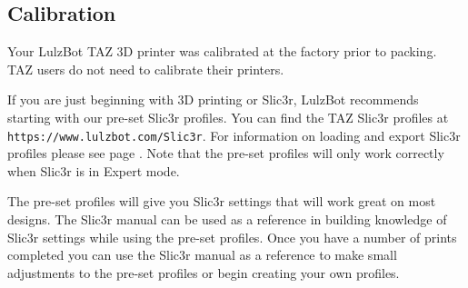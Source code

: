 
\subsection{Calibration}
\label{calibration}

Your LulzBot\textsuperscript{\miniscule{\texttrademark}} TAZ 3D printer was calibrated at the factory prior to packing. TAZ users do not need to calibrate their printers. 


If you are just beginning with 3D printing or Slic3r, LulzBot\textsuperscript{\miniscule{\texttrademark}} recommends starting with our pre-set Slic3r profiles. You can find the TAZ Slic3r profiles at \texttt{https://www.lulzbot.com/Slic3r}. For information on loading and export Slic3r profiles please see page \pageref{sub:exporting_and_importing_configuration}. Note that the pre-set profiles will only work correctly when Slic3r is in Expert mode.

The pre-set profiles will give you Slic3r settings that will work great on most designs. The Slic3r manual can be used as a reference in building knowledge of Slic3r settings while using the pre-set profiles. Once you have a number of prints completed you can use the Slic3r manual as a reference to make small adjustments to the pre-set profiles or begin creating your own profiles.
